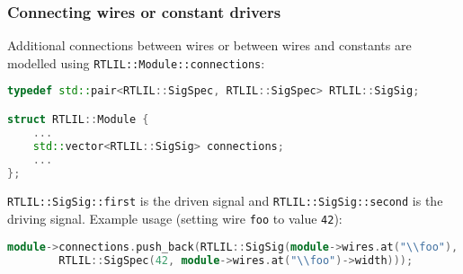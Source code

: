 
\subsubsection{Connecting wires or constant drivers}

\begin{frame}[t, fragile]{\subsubsecname}
Additional connections between wires or between wires and constants are modelled using
{\tt RTLIL::Module::connections}:

\bigskip
\begin{lstlisting}[xleftmargin=1cm, basicstyle=\ttfamily\fontsize{8pt}{10pt}\selectfont, language=C++]
typedef std::pair<RTLIL::SigSpec, RTLIL::SigSpec> RTLIL::SigSig;

struct RTLIL::Module {
    ...
    std::vector<RTLIL::SigSig> connections;
    ...
};
\end{lstlisting}

\bigskip
{\tt RTLIL::SigSig::first} is the driven signal and {\tt RTLIL::SigSig::second} is the driving signal.
Example usage (setting wire {\tt foo} to value {\tt 42}):
\begin{lstlisting}[xleftmargin=1cm, basicstyle=\ttfamily\fontsize{8pt}{10pt}\selectfont, language=C++]
module->connections.push_back(RTLIL::SigSig(module->wires.at("\\foo"),
        RTLIL::SigSpec(42, module->wires.at("\\foo")->width)));
\end{lstlisting}
\end{frame}

